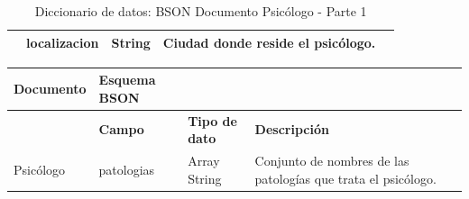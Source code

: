 \begin{table}[htpb]
\begin{tabularx}{\textwidth}{|l|X|X|X|X|}
                   & localizacion                                                                                                                                           & String                                                                                                                     & Ciudad donde reside el psicólogo.                                                                                                                                                                                                                                            \\ \hline
\end{tabularx}
\caption{Diccionario de datos: BSON Documento Psicólogo - Parte 1}
\label{fig:dic_datos_BSON_4}
\end{table}

\begin{table}[htpb]
\centering
\begin{tabularx}{\textwidth}{|l|X|X|X|X|}
\hline
\rowcolor[gray]{0.9}\textbf{Documento}          & \textbf{Esquema BSON                                                                                                                                          } &                                                                                                                            &                                                                                                                                                                                                                                                                             \\ \hline
                   & \textbf{Campo}                                                                                                                                                  & \textbf{Tipo de dato}                                                                                                               & \textbf{Descripción                                                                                                                                                                                                                                                                } \\ \hline
Psicólogo         & patologias                                                                                                                                             & Array String                                                                                                               & Conjunto de nombres de las patologías que trata el psicólogo.                                                                                                                                                                                                               

\end{tabularx}
\end{table}
